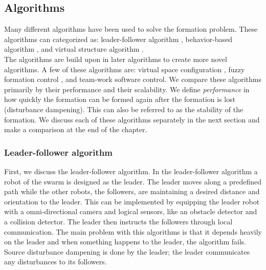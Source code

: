 \subsection{Algorithms}
Many different algorithms have been used to solve the formation problem. \cite{chen2005formation,consolini2008leader}
These algorithms can categorized as: leader-follower algorithm \cite{consolini2008leader,das2002vision}, 
behavior-based algorithm \cite{balch1998behavior,lawton2003decentralized}, 
and virtual structure algorithm \cite{ren2004decentralized,do2007nonlinear}. \\
The algorithms are build upon in later algorithms to create more novel algorithms. A few of these algorithms are:
virtual space configuration \cite{wee2013formation}, 
fuzzy formation control \cite{ranjbar2012novel},
and team-work software control. \cite{kaminka2013use}
We compare these algorithms primarily by their performance and their scalability.
We define \emph{performance} in how quickly the formation can be formed again after the formation is lost (disturbance dampening).
This can also be referred to as the stability of the formation.
We discuss each of these algorithms separately in the next section and make a comparison at the end of the chapter.

\subsubsection{Leader-follower algorithm}
First, we discuss the leader-follower algorithm.
In the leader-follower algorithm a robot of the swarm is designed as the leader.
The leader moves along a predefined path while the other robots, the followers, are maintaining a desired distance and orientation to the leader. \cite{consolini2008leader}
This can be implemented by equipping the leader robot with a omni-directional camera and logical sensors, like an obstacle detector and a collision detector.
The leader then instructs the followers through local communication. \cite{das2002vision}
The main problem with this algorithms is that it depends heavily on the leader and when something happens to the leader, the algorithm fails.
Source disturbance dampening is done by the leader; the leader communicates any disturbances to its followers.

